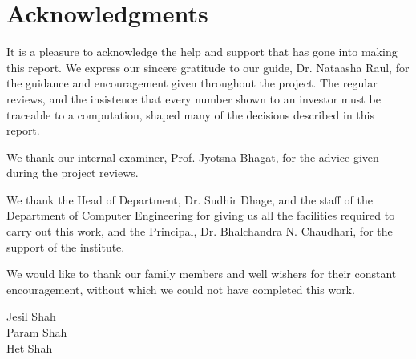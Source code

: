 \chapter*{Acknowledgments}
It is a pleasure to acknowledge the help and support that has gone into making this report. We express our sincere gratitude to our guide, Dr. Nataasha Raul, for the guidance and encouragement given throughout the project. The regular reviews, and the insistence that every number shown to an investor must be traceable to a computation, shaped many of the decisions described in this report.

We thank our internal examiner, Prof. Jyotsna Bhagat, for the advice given during the project reviews.

We thank the Head of Department, Dr. Sudhir Dhage, and the staff of the Department of Computer Engineering for giving us all the facilities required to carry out this work, and the Principal, Dr. Bhalchandra N. Chaudhari, for the support of the institute.

We would like to thank our family members and well wishers for their constant encouragement, without which we could not have completed this work.

\vspace{1cm}
\begin{flushright}
Jesil Shah\\
Param Shah\\
Het Shah
\end{flushright}
